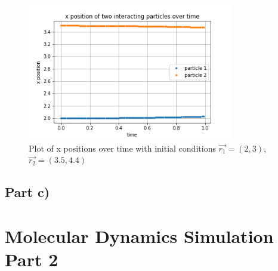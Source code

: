 \documentclass{article}
\begin{document}
\begin{figure}[H]
	\centering
	\includegraphics[width=0.8\textwidth]{../images/q2_iii_xpos.png}
	\caption{Plot of x positions over time with initial conditions $\vec{r_1}=(2,3)$, $\vec{r_2}=(3.5,4.4)$}
	\label{fig:q2_iii_xpos}
\end{figure}

\subsection{Part c)}

\section{Molecular Dynamics Simulation Part 2}
\end{document}
